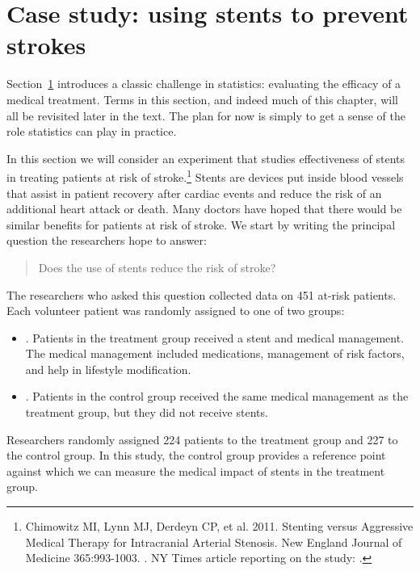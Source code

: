 \section{Case study: using stents to prevent strokes}
\label{basicExampleOfStentsAndStrokes}


Section~\ref{basicExampleOfStentsAndStrokes} introduces a classic challenge in statistics: evaluating the efficacy of a medical treatment. Terms in this section, and indeed much of this chapter, will all be revisited later in the text. The plan for now is simply to get a sense of the role statistics can play in practice.

In this section we will consider an experiment that studies effectiveness of stents in treating patients at risk of stroke.\footnote{Chimowitz MI, Lynn MJ, Derdeyn CP, et al. 2011. Stenting versus Aggressive Medical Therapy for Intracranial Arterial Stenosis. New England Journal of Medicine 365:993-1003. . NY Times article reporting on the study: .} Stents are devices put inside blood vessels that assist in patient recovery after cardiac events and reduce the risk of an additional heart attack or death. Many doctors have hoped that there would be similar benefits for patients at risk of stroke. We start by writing the principal question the researchers hope to answer:
\begin{quote}
Does the use of stents reduce the risk of stroke?
\end{quote}

The researchers who asked this question collected data on 451 at-risk patients. Each volunteer patient was randomly assigned to one of two groups:
\begin{itemize}
\item[]. Patients in the treatment group received a stent and medical management. The medical management included medications, management of risk factors, and help in lifestyle modification.
\item[]. Patients in the control group received the same medical management as the treatment group, but they did not receive stents.
\end{itemize}
Researchers randomly assigned 224 patients to the treatment group and 227 to the control group. In this study, the control group provides a reference point against which we can measure the medical impact of stents in the treatment group.


